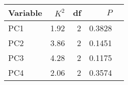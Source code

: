 
\begin{tabular}{lrrrl}
\toprule
Variable & $K^2$ & df & $P$ & \\
\midrule
PC1 & 1.92 & 2 & 0.3828 & \\
PC2 & 3.86 & 2 & 0.1451 & \\
PC3 & 4.28 & 2 & 0.1175 & \\
PC4 & 2.06 & 2 & 0.3574 & \\
\bottomrule
\end{tabular}
